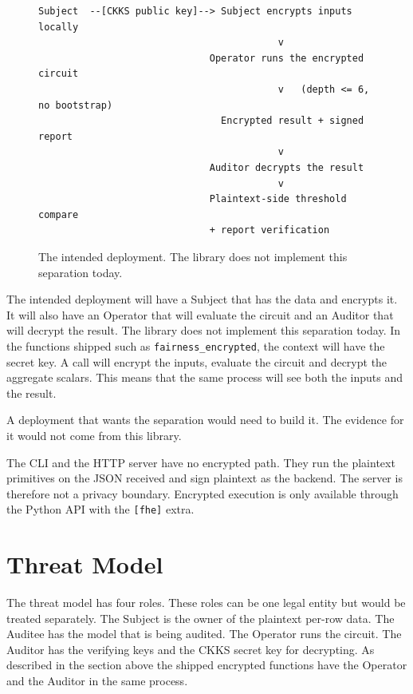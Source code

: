 \documentclass[10pt,a4paper]{article}
\begin{document}
\begin{figure}[h]
\begin{lstlisting}
Subject  --[CKKS public key]--> Subject encrypts inputs locally
                                          v
                              Operator runs the encrypted circuit
                                          v   (depth <= 6, no bootstrap)
                                Encrypted result + signed report
                                          v
                              Auditor decrypts the result
                                          v
                              Plaintext-side threshold compare
                              + report verification
\end{lstlisting}
\caption{The intended deployment. The library does not implement this separation today.}
\end{figure}

The intended deployment will have a Subject that has the data and encrypts it. It will also have an Operator that will evaluate the circuit and an Auditor that will decrypt the result. The library does not implement this separation today. In the functions shipped such as \texttt{fairness\_encrypted}, the context will have the secret key. A call will encrypt the inputs, evaluate the circuit and decrypt the aggregate scalars. This means that the same process will see both the inputs and the result.

A deployment that wants the separation would need to build it. The evidence for it would not come from this library.

The CLI and the HTTP server have no encrypted path. They run the plaintext primitives on the JSON received and sign plaintext as the backend. The server is therefore not a privacy boundary. Encrypted execution is only available through the Python API with the \texttt{[fhe]} extra.

\section{Threat Model}

The threat model has four roles. These roles can be one legal entity but would be treated separately. The Subject is the owner of the plaintext per-row data. The Auditee has the model that is being audited. The Operator runs the circuit. The Auditor has the verifying keys and the CKKS secret key for decrypting. As described in the section above the shipped encrypted functions have the Operator and the Auditor in the same process.
\end{document}
